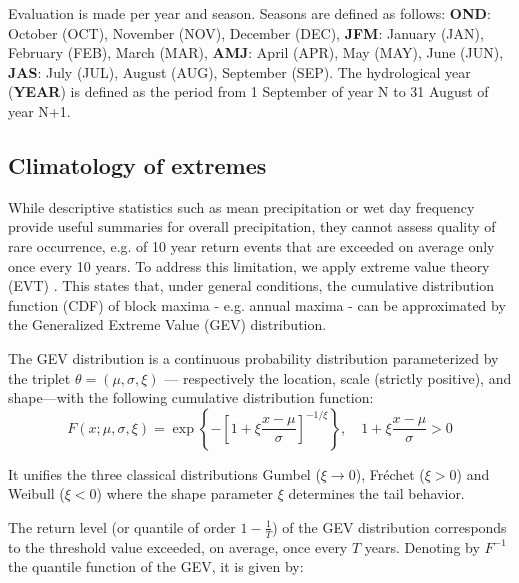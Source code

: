 \documentclass[french,a4paper,DIV=11,numbers=noendperiod]{scrartcl}
\begin{document}
Evaluation is made per year and season. Seasons are defined as follows: \textbf{OND}:
October (OCT), November (NOV), December (DEC), \textbf{JFM}: January
(JAN), February (FEB), March (MAR), \textbf{AMJ}: April (APR), May
(MAY), June (JUN), \textbf{JAS}: July (JUL), August (AUG), September
(SEP). The hydrological year (\textbf{YEAR}) is defined as the period
from 1 September of year N to 31 August of year N+1.

\subsection{Climatology of extremes}\label{climatology}


While descriptive statistics such as mean precipitation or wet day frequency provide useful summaries for overall precipitation, they cannot assess quality of rare occurrence, e.g. of 10 year return events that are exceeded on average only once every 10 years. %
To address
this limitation, we apply extreme value theory (EVT) \parencite{coles2001introduction}. This states that, under general conditions, the cumulative distribution function (CDF) of block maxima - e.g. annual maxima - can be approximated by the Generalized Extreme Value (GEV)
distribution.

The GEV distribution is a continuous
probability distribution parameterized by the triplet
\(\theta = (\mu, \sigma, \xi)\) --- respectively the location, scale
(strictly positive), and shape---with the following cumulative
distribution function: \[
F(x;\mu ,\sigma ,\xi) = \exp\left\{-\left[1 + \xi\frac{x - \mu}{\sigma}\right]^{-1/\xi}\right\}, \quad 1 + \xi\frac{x - \mu}{\sigma} > 0
\]

It unifies the three classical distributions Gumbel (\(\xi \to 0\)), Fréchet (\(\xi > 0\)) and Weibull (\(\xi < 0\)) where the shape parameter \(\xi\) determines the tail behavior.

The return level (or quantile of order \(1 - \tfrac{1}{T}\)) of the GEV
distribution corresponds to the threshold value exceeded, on
average, once every \(T\) years. 
Denoting by $F^{-1}$ the quantile function of the GEV, it is given by:
\end{document}
